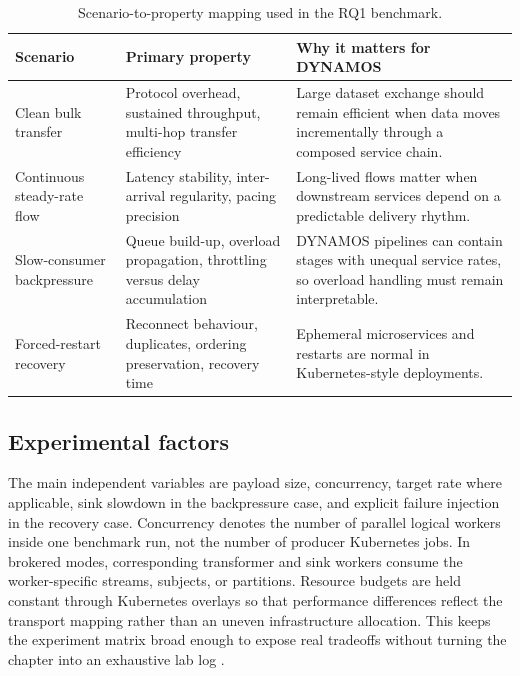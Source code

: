 \begin{table}[!htbp]
    \centering
    \footnotesize
    \caption{Scenario-to-property mapping used in the RQ1 benchmark.}
    \label{tab:phase1-scenario-map}
    \setlength{\tabcolsep}{5pt}
    \begin{tabular}{p{}p{}p{}}
        \toprule
        Scenario & Primary property & Why it matters for DYNAMOS \\
        \midrule
        Clean bulk transfer & Protocol overhead, sustained throughput, multi-hop transfer efficiency & Large dataset exchange should remain efficient when data moves incrementally through a composed service chain. \\
        Continuous steady-rate flow & Latency stability, inter-arrival regularity, pacing precision & Long-lived flows matter when downstream services depend on a predictable delivery rhythm. \\
        Slow-consumer backpressure & Queue build-up, overload propagation, throttling versus delay accumulation & DYNAMOS pipelines can contain stages with unequal service rates, so overload handling must remain interpretable. \\
        Forced-restart recovery & Reconnect behaviour, duplicates, ordering preservation, recovery time & Ephemeral microservices and restarts are normal in Kubernetes-style deployments. \\
        \bottomrule
    \end{tabular}
\end{table}

\subsection{Experimental factors}

The main independent variables are payload size, concurrency, target rate where applicable, sink slowdown in the backpressure case, and explicit failure injection in the recovery case. Concurrency denotes the number of parallel logical workers inside one benchmark run, not the number of producer Kubernetes jobs. In brokered modes, corresponding transformer and sink workers consume the worker-specific streams, subjects, or partitions. Resource budgets are held constant through Kubernetes overlays so that performance differences reflect the transport mapping rather than an uneven infrastructure allocation. This keeps the experiment matrix broad enough to expose real tradeoffs without turning the chapter into an exhaustive lab log \cite{sharvari2019messaging,ciftci2025ipcmechanisms}.

